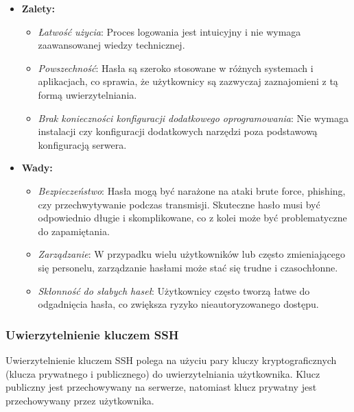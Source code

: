 \documentclass{article}
\begin{document}
\begin{itemize}
    \item \textbf{Zalety:}
    \begin{itemize}
        \item \textit{Łatwość użycia}: Proces logowania jest intuicyjny i nie wymaga zaawansowanej wiedzy technicznej.
        \item \textit{Powszechność}: Hasła są szeroko stosowane w różnych systemach i aplikacjach, co sprawia, że użytkownicy są zazwyczaj zaznajomieni z tą formą uwierzytelniania.
        \item \textit{Brak konieczności konfiguracji dodatkowego oprogramowania}: Nie wymaga instalacji czy konfiguracji dodatkowych narzędzi poza podstawową konfiguracją serwera.
    \end{itemize}
    \item \textbf{Wady:}
    \begin{itemize}
        \item \textit{Bezpieczeństwo}: Hasła mogą być narażone na ataki brute force, phishing, czy przechwytywanie podczas transmisji. Skuteczne hasło musi być odpowiednio długie i skomplikowane, co z kolei może być problematyczne do zapamiętania.
        \item \textit{Zarządzanie}: W przypadku wielu użytkowników lub często zmieniającego się personelu, zarządzanie hasłami może stać się trudne i czasochłonne.
        \item \textit{Skłonność do słabych haseł}: Użytkownicy często tworzą łatwe do odgadnięcia hasła, co zwiększa ryzyko nieautoryzowanego dostępu.
    \end{itemize}
\end{itemize}

\subsubsection{Uwierzytelnienie kluczem SSH}

Uwierzytelnienie kluczem SSH polega na użyciu pary kluczy kryptograficznych (klucza prywatnego i publicznego) do uwierzytelniania użytkownika. Klucz publiczny jest przechowywany na serwerze, natomiast klucz prywatny jest przechowywany przez użytkownika.
\end{document}
